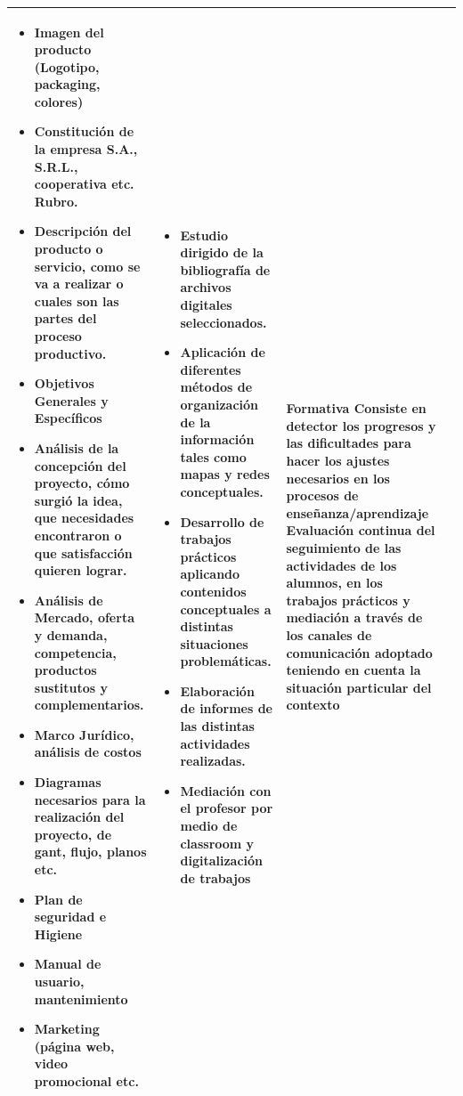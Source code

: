 \documentclass[a4paper]{article}
\newcommand{\estrategias}{\setstretch{2} \centering \begin{itemize}[leftmargin=0.3cm]\item Estudio dirigido de la bibliografía de archivos digitales seleccionados.\item Aplicación de diferentes métodos de organización de la información tales como mapas y redes conceptuales. \item Desarrollo de trabajos prácticos aplicando contenidos conceptuales a distintas situaciones problemáticas.\item Elaboración de informes de las distintas actividades realizadas.\item Mediación con el profesor por medio de classroom  y digitalización de trabajos\end{itemize}
}
\newcommand{\evaluacion}{\textbf{Formativa} \setstretch{2} Consiste en detector los progresos y las dificultades para hacer los ajustes necesarios en los procesos de enseñanza/aprendizaje   Evaluación continua del seguimiento de las actividades de los alumnos, en los trabajos prácticos y mediación a través de los canales de comunicación adoptado teniendo en cuenta la situación particular del contexto}
\begin{document}
\begin{longtable}{|p{6.5cm}|p{6.5cm}|p{6.5cm}|p{6.5cm}|}
\begin{itemize}[leftmargin=0.3cm]
        \item Imagen del producto (Logotipo, packaging,
colores)
\item Constitución de la empresa S.A., S.R.L.,
cooperativa etc. Rubro.
\item Descripción del producto o servicio, como se va
a realizar o cuales son las partes del proceso productivo.
\item Objetivos Generales y Específicos
\item Análisis de la concepción del proyecto, cómo
surgió la idea, que necesidades encontraron o
que satisfacción quieren lograr.
\item Análisis de Mercado, oferta y demanda,
competencia, productos sustitutos y
complementarios.
\item Marco Jurídico, análisis de costos
\item Diagramas necesarios para la realización del
proyecto, de gant, flujo, planos etc.
\item Plan de seguridad e Higiene
\item Manual de usuario, mantenimiento
\item Marketing (página web, video promocional etc.
    
         \end{itemize}
         & \estrategias & \evaluacion\\ \hline
         
    \end{longtable}
\clearpage

\end{document}
